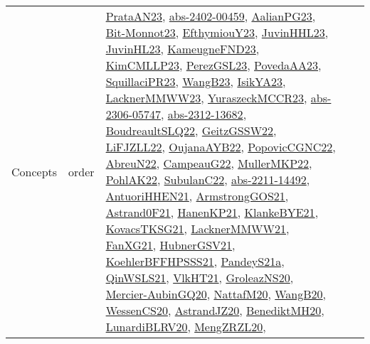 {\begin{longtable}{llp{6cm}p{6cm}p{6cm}}
Concepts & order & \href{articles/PrataAN23.pdf}{PrataAN23}\cite{PrataAN23}, \href{articles/abs-2402-00459.pdf}{abs-2402-00459}\cite{abs-2402-00459}, \href{papers/AalianPG23.pdf}{AalianPG23}\cite{AalianPG23}, \href{papers/Bit-Monnot23.pdf}{Bit-Monnot23}\cite{Bit-Monnot23}, \href{papers/EfthymiouY23.pdf}{EfthymiouY23}\cite{EfthymiouY23}, \href{papers/JuvinHHL23.pdf}{JuvinHHL23}\cite{JuvinHHL23}, \href{papers/JuvinHL23.pdf}{JuvinHL23}\cite{JuvinHL23}, \href{papers/KameugneFND23.pdf}{KameugneFND23}\cite{KameugneFND23}, \href{papers/KimCMLLP23.pdf}{KimCMLLP23}\cite{KimCMLLP23}, \href{papers/PerezGSL23.pdf}{PerezGSL23}\cite{PerezGSL23}, \href{papers/PovedaAA23.pdf}{PovedaAA23}\cite{PovedaAA23}, \href{papers/SquillaciPR23.pdf}{SquillaciPR23}\cite{SquillaciPR23}, \href{papers/WangB23.pdf}{WangB23}\cite{WangB23}, \href{articles/IsikYA23.pdf}{IsikYA23}\cite{IsikYA23}, \href{articles/LacknerMMWW23.pdf}{LacknerMMWW23}\cite{LacknerMMWW23}, \href{articles/YuraszeckMCCR23.pdf}{YuraszeckMCCR23}\cite{YuraszeckMCCR23}, \href{articles/abs-2306-05747.pdf}{abs-2306-05747}\cite{abs-2306-05747}, \href{articles/abs-2312-13682.pdf}{abs-2312-13682}\cite{abs-2312-13682}, \href{papers/BoudreaultSLQ22.pdf}{BoudreaultSLQ22}\cite{BoudreaultSLQ22}, \href{papers/GeitzGSSW22.pdf}{GeitzGSSW22}\cite{GeitzGSSW22}, \href{papers/LiFJZLL22.pdf}{LiFJZLL22}\cite{LiFJZLL22}, \href{papers/OujanaAYB22.pdf}{OujanaAYB22}\cite{OujanaAYB22}, \href{papers/PopovicCGNC22.pdf}{PopovicCGNC22}\cite{PopovicCGNC22}, \href{articles/AbreuN22.pdf}{AbreuN22}\cite{AbreuN22}, \href{articles/CampeauG22.pdf}{CampeauG22}\cite{CampeauG22}, \href{articles/MullerMKP22.pdf}{MullerMKP22}\cite{MullerMKP22}, \href{articles/PohlAK22.pdf}{PohlAK22}\cite{PohlAK22}, \href{articles/SubulanC22.pdf}{SubulanC22}\cite{SubulanC22}, \href{articles/abs-2211-14492.pdf}{abs-2211-14492}\cite{abs-2211-14492}, \href{papers/AntuoriHHEN21.pdf}{AntuoriHHEN21}\cite{AntuoriHHEN21}, \href{papers/ArmstrongGOS21.pdf}{ArmstrongGOS21}\cite{ArmstrongGOS21}, \href{papers/Astrand0F21.pdf}{Astrand0F21}\cite{Astrand0F21}, \href{papers/HanenKP21.pdf}{HanenKP21}\cite{HanenKP21}, \href{papers/KlankeBYE21.pdf}{KlankeBYE21}\cite{KlankeBYE21}, \href{papers/KovacsTKSG21.pdf}{KovacsTKSG21}\cite{KovacsTKSG21}, \href{papers/LacknerMMWW21.pdf}{LacknerMMWW21}\cite{LacknerMMWW21}, \href{articles/FanXG21.pdf}{FanXG21}\cite{FanXG21}, \href{articles/HubnerGSV21.pdf}{HubnerGSV21}\cite{HubnerGSV21}, \href{articles/KoehlerBFFHPSSS21.pdf}{KoehlerBFFHPSSS21}\cite{KoehlerBFFHPSSS21}, \href{articles/PandeyS21a.pdf}{PandeyS21a}\cite{PandeyS21a}, \href{articles/QinWSLS21.pdf}{QinWSLS21}\cite{QinWSLS21}, \href{articles/VlkHT21.pdf}{VlkHT21}\cite{VlkHT21}, \href{papers/GroleazNS20.pdf}{GroleazNS20}\cite{GroleazNS20}, \href{papers/Mercier-AubinGQ20.pdf}{Mercier-AubinGQ20}\cite{Mercier-AubinGQ20}, \href{papers/NattafM20.pdf}{NattafM20}\cite{NattafM20}, \href{papers/WangB20.pdf}{WangB20}\cite{WangB20}, \href{papers/WessenCS20.pdf}{WessenCS20}\cite{WessenCS20}, \href{articles/AstrandJZ20.pdf}{AstrandJZ20}\cite{AstrandJZ20}, \href{articles/BenediktMH20.pdf}{BenediktMH20}\cite{BenediktMH20}, \href{articles/LunardiBLRV20.pdf}{LunardiBLRV20}\cite{LunardiBLRV20}, \href{articles/MengZRZL20.pdf}{MengZRZL20}\cite{MengZRZL20}, 
\end{longtable}}
